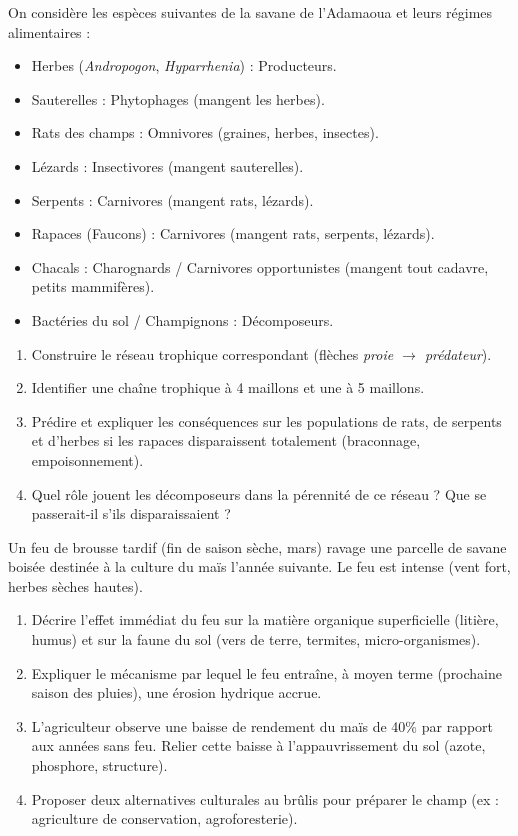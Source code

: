\documentclass[11pt]{article}
\begin{document}
\begin{exercice}
On considère les espèces suivantes de la savane de l'Adamaoua et leurs régimes alimentaires :
\begin{itemize}
    \item Herbes (\emph{Andropogon}, \emph{Hyparrhenia}) : Producteurs.
    \item Sauterelles : Phytophages (mangent les herbes).
    \item Rats des champs : Omnivores (graines, herbes, insectes).
    \item Lézards : Insectivores (mangent sauterelles).
    \item Serpents : Carnivores (mangent rats, lézards).
    \item Rapaces (Faucons) : Carnivores (mangent rats, serpents, lézards).
    \item Chacals : Charognards / Carnivores opportunistes (mangent tout cadavre, petits mammifères).
    \item Bactéries du sol / Champignons : Décomposeurs.
\end{itemize}

\begin{enumerate}
    \item Construire le réseau trophique correspondant (flèches \emph{proie $\rightarrow$ prédateur}).
    \item Identifier une chaîne trophique à 4 maillons et une à 5 maillons.
    \item Prédire et expliquer les conséquences sur les populations de rats, de serpents et d'herbes si les rapaces disparaissent totalement (braconnage, empoisonnement).
    \item Quel rôle jouent les décomposeurs dans la pérennité de ce réseau ? Que se passerait-il s'ils disparaissaient ?
\end{enumerate}
\end{exercice}

\begin{exercice}
Un feu de brousse tardif (fin de saison sèche, mars) ravage une parcelle de savane boisée destinée à la culture du maïs l'année suivante. Le feu est intense (vent fort, herbes sèches hautes).

\begin{enumerate}
    \item Décrire l'effet immédiat du feu sur la matière organique superficielle (litière, humus) et sur la faune du sol (vers de terre, termites, micro-organismes).
    \item Expliquer le mécanisme par lequel le feu entraîne, à moyen terme (prochaine saison des pluies), une érosion hydrique accrue.
    \item L'agriculteur observe une baisse de rendement du maïs de \num{40}\% par rapport aux années sans feu. Relier cette baisse à l'appauvrissement du sol (azote, phosphore, structure).
    \item Proposer deux alternatives culturales au brûlis pour préparer le champ (ex : agriculture de conservation, agroforesterie).
\end{enumerate}
\end{exercice}
\end{document}
